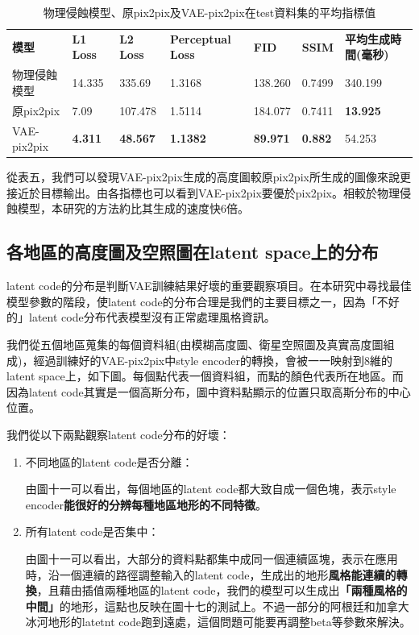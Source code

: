 \documentclass[a4paper, 12pt]{article}
\begin{document}
\begin{table}[H]
    \caption{物理侵蝕模型、原pix2pix及VAE-pix2pix在test資料集的平均指標值}
    \label{tab:7}
    \begin{tabularx}{\linewidth}{|Y|Y|Y|Y|Y|Y|Y|}
        \hline
        \textbf{模型} & \textbf{L1 Loss} & \textbf{L2 Loss} & \textbf{Perceptual Loss} & \textbf{FID}    & \textbf{SSIM}  & \textbf{平均生成時間(毫秒)} \\ \hhline{|=|=|=|=|=|=|=|}
        物理侵蝕模型  & 14.335            & 335.69          & 1.3168 & 138.260 & 0.7499         & 340.199                       \\ \hline
        原pix2pix     & 7.09            & 107.478         & 1.5114 & 184.077 & 0.7411         & \textbf{13.925}              \\ \hline
        VAE-pix2pix   & \textbf{4.311}   & \textbf{48.567}   & \textbf{1.1382}           & \textbf{89.971} & \textbf{0.882} & 54.253                     \\ \hline
    \end{tabularx}
\end{table}

從表五，我們可以發現VAE-pix2pix生成的高度圖較原pix2pix所生成的圖像來說更接近於目標輸出。由各指標也可以看到VAE-pix2pix要優於pix2pix。相較於物理侵蝕模型，本研究的方法約比其生成的速度快6倍。

\subsection{各地區的高度圖及空照圖在latent space上的分布}
latent code的分布是判斷VAE訓練結果好壞的重要觀察項目。在本研究中尋找最佳模型參數的階段，使latent code的分布合理是我們的主要目標之一，因為「不好的」latent code分布代表模型沒有正常處理風格資訊。

我們從五個地區蒐集的每個資料組(由模糊高度圖、衛星空照圖及真實高度圖組成)，經過訓練好的VAE-pix2pix中style encoder的轉換，會被一一映射到8維的latent space上，如下圖。每個點代表一個資料組，而點的顏色代表所在地區。而因為latent code其實是一個高斯分布，圖中資料點顯示的位置只取高斯分布的中心位置。

我們從以下兩點觀察latent code分布的好壞：
\begin{enumerate}
\item 不同地區的latent code是否分離：

由圖十一可以看出，每個地區的latent code都大致自成一個色塊，表示style encoder\textbf{能很好的分辨每種地區地形的不同特徵}。

\item 所有latent code是否集中：

由圖十一可以看出，大部分的資料點都集中成同一個連續區塊，表示在應用時，沿一個連續的路徑調整輸入的latent code，生成出的地形\textbf{風格能連續的轉換}，且藉由插值兩種地區的latent code，我們的模型可以生成出\textbf{「兩種風格的中間」}的地形，這點也反映在圖十七的測試上。不過一部分的阿根廷和加拿大冰河地形的latetnt code跑到遠處，這個問題可能要再調整beta等參數來解決。
\end{enumerate}
\end{document}
